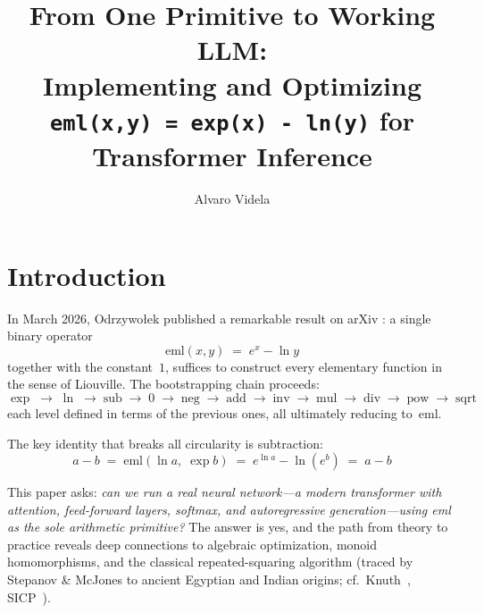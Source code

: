 \documentclass[acmsmall,nonacm]{acmart}
\title{From One Primitive to Working LLM:\\
  Implementing and Optimizing\\ \texttt{eml(x,y) = exp(x) - ln(y)} for Transformer Inference}
\author{Alvaro Videla}
\affiliation{%
  \institution{Independent Researcher}
  \city{N/A}
  \country{N/A}
}
\begin{document}
\maketitle

\section{Introduction}
\label{sec:intro}

In March 2026, Odrzywołek published a remarkable result on arXiv
\cite{odrzywołek2026}: a single binary operator
\begin{equation}\label{eq:eml}
  \mathrm{eml}(x, y) \;=\; e^x - \ln y
\end{equation}
together with the constant~$1$, suffices to construct every elementary
function in the sense of Liouville.  The bootstrapping chain proceeds:
\[
  \exp \;\to\; \ln \;\to\; \mathrm{sub} \;\to\; 0 \;\to\;
  \mathrm{neg} \;\to\; \mathrm{add} \;\to\; \mathrm{inv} \;\to\;
  \mathrm{mul} \;\to\; \mathrm{div} \;\to\; \mathrm{pow} \;\to\;
  \mathrm{sqrt}
\]
each level defined in terms of the previous ones, all ultimately
reducing to~$\mathrm{eml}$.

The key identity that breaks all circularity is subtraction:
\begin{equation}\label{eq:sub}
  a - b \;=\; \mathrm{eml}(\ln a,\;\exp b)
  \;=\; e^{\ln a} - \ln(e^b) \;=\; a - b
\end{equation}

This paper asks: \emph{can we run a real neural network---a modern
transformer with attention, feed-forward layers, softmax, and
autoregressive generation---using eml as the sole arithmetic
primitive?}  The answer is yes, and the path from theory to practice
reveals deep connections to algebraic optimization, monoid
homomorphisms, and the classical repeated-squaring algorithm
(traced by Stepanov \& McJones \cite{stepanov2009} to ancient
Egyptian and Indian origins; cf.\ Knuth~\cite{knuth1997},
SICP~\cite{sicp}).
\end{document}
